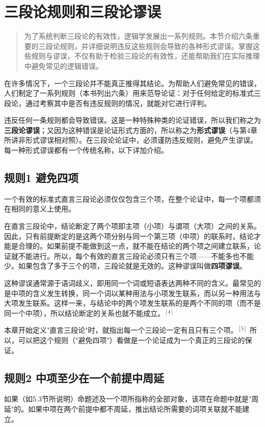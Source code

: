 \section{三段论规则和三段论谬误}

\begin{quotation}
为了系统判断三段论的有效性，逻辑学发展出一系列规则。本节介绍六条重要的三段论规则，并详细说明违反这些规则会导致的各种形式谬误。掌握这些规则与谬误，不仅有助于检验三段论的有效性，还能帮助我们在实际推理中避免常见的逻辑错误。
\end{quotation}

在许多情况下，一个三段论并不能真正推得其结论。为帮助人们避免常见的错误，人们制定了一系列规则（本书列出六条）用来范导论证：对于任何给定的标准式三段论，通过考察其中是否有违反规则的情况，就能对它进行评判。

违反任何一条规则都会导致错误。这是一种特殊种类的论证错误，所以我们称之为\textbf{三段论谬误}；又因为这种错误是论证形式方面的，所以称之为\textbf{形式谬误}（与第4章所讲非形式谬误相对照）。在三段论论证中，必须谨防违反规则，避免产生谬误。每一种形式谬误都有一个传统名称，以下详加介绍。

\subsection{规则1 避免四项}
一个有效的标准式直言三段论必须仅仅包含三个项，在整个论证中，每一个项都须在相同的意义上使用。

在直言三段论中，结论断定了两个项即主项（小项）与谓项（大项）之间的关系。因此，只有前提断定的是这两个项分别与同一个第三项（中项）的联系时，结论才能是合理的。如果前提不能做到这一点，就不能在结论的两个项之间建立联系，论证就不能进行。所以，每个有效的直言三段论必须只有三个项——不能多也不能少。如果包含了多于三个的项，三段论就是无效的。这种谬误叫做\textbf{四项谬误}。

这种谬误通常源于语词歧义，即用同一个词或短语表达两种不同的含义。最常见的是中项的含义发生转换，同一个词以某种用法与小项发生联系，而以另一种用法与大项发生联系。这样一来，与结论中的两个项发生联系的是两个不同的项（而不是同一个中项），所以结论断定的关系也就不能成立。$^{[4]}$

本章开始定义"直言三段论"时，就指出每一个三段论一定有且只有三个项。$^{[5]}$ 所以，可以把这个规则（"避免四项"）看做是一个论证成为一个真正的三段论的保证。

\subsection{规则2 中项至少在一个前提中周延}
如果（如5.3节所说明）命题述及一个项所指称的全部对象，该项在命题中就是"周延"的。如果中项在两个前提中都不周延，推出结论所需要的词项关联就不能建立。

